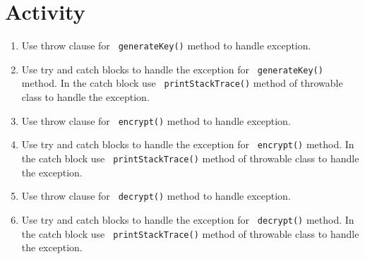 \section{Activity}
\begin{enumerate}

\item Use throw clause for \verb= generateKey()= method to handle exception.

\item Use try and catch blocks to handle the exception for \verb= generateKey()= method. In the catch block use \verb= printStackTrace()= method of throwable class to handle the exception.

\item Use throw clause for \verb= encrypt()= method to handle exception.

\item Use try and catch blocks to handle the exception for \verb= encrypt()= method. In the catch block use \verb= printStackTrace()= method of throwable class to handle the exception.

\item Use throw clause for \verb= decrypt()= method to handle exception.

\item Use try and catch blocks to handle the exception for \verb= decrypt()= method. In the catch block use \verb= printStackTrace()= method of throwable class to handle the exception.
\end{enumerate}



